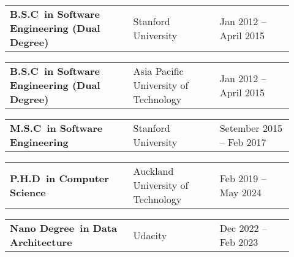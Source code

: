 \documentclass[10pt,a4paper,ragged2e,withhyper]{altacv}
\renewcommand{\cvevent}[4]{%
  \textbf{#1} %
  \hfill %
  \begin{minipage}[t]{.5\linewidth}
    \raggedleft %
    \small#3 %
    \\ %
    #4 %
  \end{minipage}
  \vspace{\baselineskip} %
}
\begin{document}
\vspace{0.5cm}


\renewcommand{\cvevent}[4]{%
  \noindent
  \begin{tabular}{@{}p{0.4\linewidth}p{0.28\linewidth}p{0.2433\linewidth}@{}}
    \small\textbf{#1} & %
    \small{#2} & %
    \raggedleft\arraybackslash\small{#3} %
  \end{tabular}
  \par %
  \vspace{0.5em} %
}








\cvevent{B.S.C\ in Software Engineering (Dual Degree)}{Stanford University}{Jan 2012 -- April 2015}{}

\divider

\cvevent{B.S.C\ in Software Engineering (Dual Degree)}{Asia Pacific University of Technology}{Jan 2012 -- April 2015}{}

\divider

\cvevent{M.S.C\ in Software Engineering}{Stanford University}{Setember 2015 -- Feb 2017}{}

\divider

\cvevent{P.H.D\ in Computer Science}{Auckland University of Technology}{Feb 2019 -- May 2024}{}

\divider

\cvevent{Nano Degree\ in Data Architecture}{Udacity}{Dec 2022 -- Feb 2023}{}

\vspace{0.5cm}


\nocite{*}

\printbibliography[heading=pubtype,title={\printinfo{\faBook}{Books}},type=book]

\divider

\printbibliography[heading=pubtype,title={\printinfo{\faFile*[regular]}{Journal Articles}}, type=article]

\divider

\printbibliography[heading=pubtype,title={\printinfo{\faUsers}{Conference Proceedings}},type=inproceedings]


\end{document}
